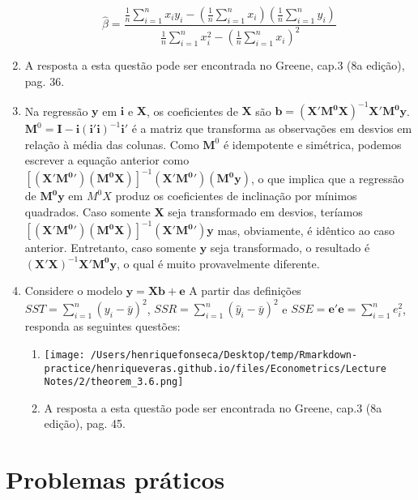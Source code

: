 \documentclass[
  11pt,
]{article}
\begin{document}
\begin{enumerate}
  \[\hat{\beta}=\frac{\frac{1}{n}\sum_{i=1}^n{x_iy_i}-\left(\frac{1}{n}\sum_{i=1}^n{x_i}\right)\left(\frac{1}{n}\sum_{i=1}^n{y_i}\right)}{\frac{1}{n}\sum_{i=1}^n{x_i^2}-\left(\frac{1}{n}\sum_{i=1}^n{x_i}\right)^2}\]
\item
  A resposta a esta questão pode ser encontrada no Greene, cap.3 (8a
  edição), pag. 36.
\item
  Na regressão \(\mathbf{y}\) em \(\mathbf{i}\) e \(\mathbf{X}\), os
  coeficientes de \(\mathbf{X}\) são
  \(\mathbf{b} = (\mathbf{X'M^0X})^{-1}\mathbf{X'M^0y}\).
  \(\mathbf{M}^0 = \mathbf{I} - \mathbf{i}(\mathbf{i'i})^{-1}\mathbf{i}'\)
  é a matriz que transforma as observações em desvios em relação à média
  das colunas. Como \(\mathbf{M}^0\) é idempotente e simétrica, podemos
  escrever a equação anterior como
  \([(\mathbf{X'M^0}')(\mathbf{M^0X})]^{-1}(\mathbf{X'M^0}')(\mathbf{M^0y})\),
  o que implica que a regressão de \(\mathbf{M^0y}\) em \(M^0X\) produz
  os coeficientes de inclinação por mínimos quadrados. Caso somente
  \(\mathbf{X}\) seja transformado em desvios, teríamos
  \([(\mathbf{X'M^0}')(\mathbf{M^0X})]^{-1}(\mathbf{X'M^0}')\mathbf{y}\)
  mas, obviamente, é idêntico ao caso anterior. Entretanto, caso somente
  \(\mathbf{y}\) seja transformado, o resultado é
  \((\mathbf{X'X})^{-1}\mathbf{X'M^0y}\), o qual é muito provavelmente
  diferente.
\item
  Considere o modelo \(\mathbf{y}=\mathbf{X}\mathbf{b}+\mathbf{e}\) A
  partir das definições \(SST=\sum_{i=1}^n{(y_i-\bar{y})^2}\),
  \(SSR=\sum_{i=1}^n{(\hat{y}_i-\bar{y})^2}\) e
  \(SSE=\mathbf{e}'\mathbf{e}=\sum_{i=1}^n{e_i^2}\), responda as
  seguintes questões:

  \begin{enumerate}
  \def\labelenumii{\alph{enumii}.}
  \item
    \texttt{[image: /Users/henriquefonseca/Desktop/temp/Rmarkdown-practice/henriqueveras.github.io/files/Econometrics/Lecture Notes/2/theorem\_3.6.png]}
  \item
    A resposta a esta questão pode ser encontrada no Greene, cap.3 (8a
    edição), pag. 45.
  \end{enumerate}
\end{enumerate}

\hypertarget{problemas-pruxe1ticos}{%
\section{Problemas práticos}\label{problemas-pruxe1ticos}}
\end{document}
